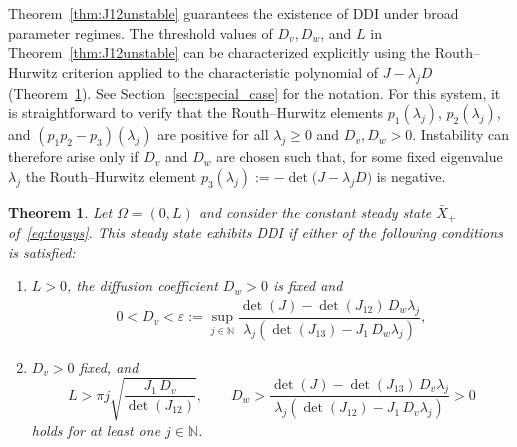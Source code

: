 \documentclass[12pt, a4paper]{amsart}
\numberwithin{equation}{section}
\newcommand{\NN}{\mathbb{N}}
\newcommand{\CSS}{\bar{X}}
\def\lp{\left(}
\def\rp{\right)}
\newtheorem{theorem}{\bf Theorem}[section]
\begin{document}
Theorem~\ref{thm:J12unstable} guarantees the existence of DDI under broad parameter regimes.
The threshold values of $D_v,D_w$, and $L$ in Theorem~\ref{thm:J12unstable} can be characterized explicitly using the Routh--Hurwitz criterion applied to the characteristic polynomial of $J - \lambda_j D$ (Theorem~\ref{lem:DDI_toysys_exact}).
See Section~\ref{sec:special_case} for the notation.
For this system, it is straightforward to verify that the Routh--Hurwitz elements $p_1(\lambda_j)$, $p_2(\lambda_j)$, and $(p_1p_2 - p_3)(\lambda_j)$ are positive for all $\lambda_j \geqslant 0$ and $D_v, D_w > 0$. 
Instability can therefore arise only if $D_v$ and $D_w$ are chosen such that, for some fixed eigenvalue $\lambda_j$ the Routh--Hurwitz element $p_3(\lambda_j) := - \det \big(J - \lambda_j D\big)$ is negative.

\begin{theorem}
\label{lem:DDI_toysys_exact}
    Let $\Omega = (0, L)$ and consider the constant steady state $\CSS_+$ of~\eqref{eq:toysys}. This steady state exhibits DDI if either of the following conditions is satisfied:
    \begin{enumerate}
        \item[(I)] $L >0$, the diffusion coefficient $D_w > 0$ is fixed and 
        \begin{align} 
        0 < D_v < \varepsilon:=\sup_{j\in\NN}\dfrac{\det(J) - \det(J_{12}) \, D_w \lambda_j}{\lambda_j \lp \det(J_{13}) - J_1 \, D_w \lambda_j \rp}, 
        \end{align}
        \item[(II)] $D_v > 0$ fixed, and
        $$ L > \pi j \sqrt{\dfrac{J_1 \, D_v }{\det(J_{12})}}, \qquad D_w >  \dfrac{\det(J) - \det(J_{13})\,D_v \lambda_j}{\lambda_j(\det(J_{12}) - J_1\,  D_v \lambda_j)} > 0 $$
        holds for at least one $j \in \mathbb N$.
    \end{enumerate} 
\end{theorem}
\end{document}
